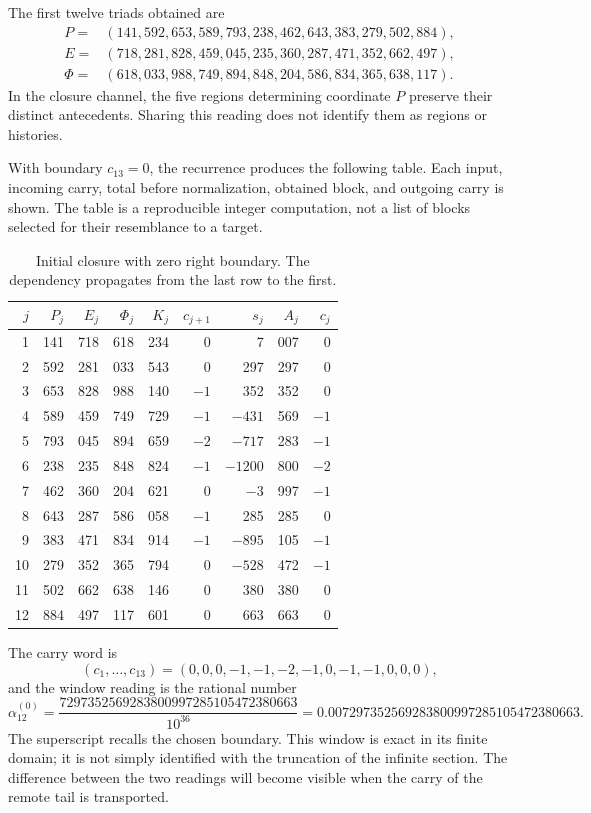 The first twelve triads obtained are
\begin{align*}
 P={}&(141,592,653,589,793,238,462,643,383,279,502,884),\\
 E={}&(718,281,828,459,045,235,360,287,471,352,662,497),\\
 \Phi={}&(618,033,988,749,894,848,204,586,834,365,638,117).
\end{align*}
In the closure channel, the five regions determining coordinate
\(P\) preserve their distinct antecedents. Sharing this reading does not
identify them as regions or histories.

With boundary \(c_{13}=0\), the recurrence produces the following table.
Each input, incoming carry, total before normalization,
obtained block, and outgoing carry is shown. The table is a reproducible integer
computation, not a list of blocks selected for their resemblance to
a target.

\begin{table}[htbp]
\centering
\small
\setlength{\tabcolsep}{3.5pt}
\begin{tabular}{r|rrrr|rr|rr}
\hline
\(j\)&\(P_j\)&\(E_j\)&\(\Phi_j\)&\(K_j\)&\(c_{j+1}\)&\(s_j\)&\(A_j\)&\(c_j\)\\
\hline
1&141&718&618&234&0&7&007&0\\
2&592&281&033&543&0&297&297&0\\
3&653&828&988&140&\(-1\)&352&352&0\\
4&589&459&749&729&\(-1\)&\(-431\)&569&\(-1\)\\
5&793&045&894&659&\(-2\)&\(-717\)&283&\(-1\)\\
6&238&235&848&824&\(-1\)&\(-1200\)&800&\(-2\)\\
7&462&360&204&621&0&\(-3\)&997&\(-1\)\\
8&643&287&586&058&\(-1\)&285&285&0\\
9&383&471&834&914&\(-1\)&\(-895\)&105&\(-1\)\\
10&279&352&365&794&0&\(-528\)&472&\(-1\)\\
11&502&662&638&146&0&380&380&0\\
12&884&497&117&601&0&663&663&0\\
\hline
\end{tabular}
\caption{Initial closure with zero right boundary. The dependency propagates from the last row to the first.}
\label{tab:alpha-ventana}
\end{table}

The carry word is
\[
 (c_1,\ldots,c_{13})=(0,0,0,-1,-1,-2,-1,0,-1,-1,0,0,0),
\]
and the window reading is the rational number
\begin{equation}
 \alpha_{12}^{(0)}
 =\frac{7297352569283800997285105472380663}{10^{36}}
 =0.007297352569283800997285105472380663.
 \label{eq:alpha-ventana-cero}
\end{equation}
The superscript recalls the chosen boundary. This window is exact in its
finite domain; it is not simply identified with the truncation of the
infinite section. The difference between the two readings will become visible when
the carry of the remote tail is transported.

